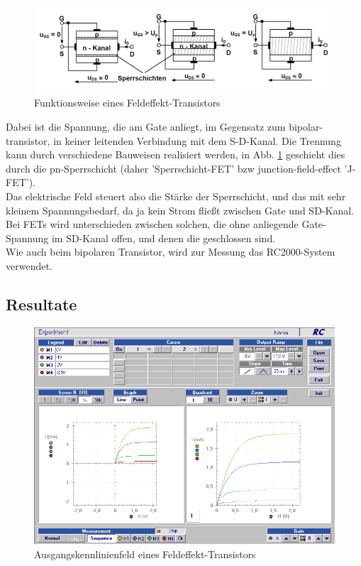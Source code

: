 \documentclass[12pt,a4paper]{article}
\begin{document}
\begin{figure}[H]
	\centering
	\includegraphics[scale=1]{./data/FET_skizze.png}
	\caption{Funktionsweise eines Feldeffekt-Transistors}
	\label{fig:FET_skizze}
\end{figure}
\begin{multicols}{2}

Dabei ist die Spannung, die am Gate anliegt, im Gegensatz zum bipolar-transistor, in keiner leitenden Verbindung mit dem S-D-Kanal. Die Trennung kann durch verschiedene Bauweisen realisiert werden, in Abb. \ref{fig:FET_skizze} geschieht dies durch die pn-Sperrschicht (daher 'Sperrschicht-FET' bzw junction-field-effect 'J-FET').\\
Das elektrische Feld steuert also die Stärke der Sperrschicht, und das mit sehr kleinem Spannungsbedarf, da ja kein Strom fließt zwischen Gate und SD-Kanal.\\
Bei FETs wird unterschieden zwischen solchen, die ohne anliegende Gate-Spannung im SD-Kanal offen, und denen die geschlossen sind.\\

Wie auch beim bipolaren Transistor, wird zur Messung das RC2000-System verwendet.



\subsection{Resultate}

\begin{figure}[H]
	\centering
	\includegraphics[scale=0.45]{./data/Braun_Kurz_PS8/FET_Ausgangskennlinien.png}
	\caption{Ausgangskennlinienfeld eines Feldeffekt-Transistors}
	\label{fig:ausgangskennlinienfeld_fet}
\end{figure}


\end{multicols}
\end{document}
